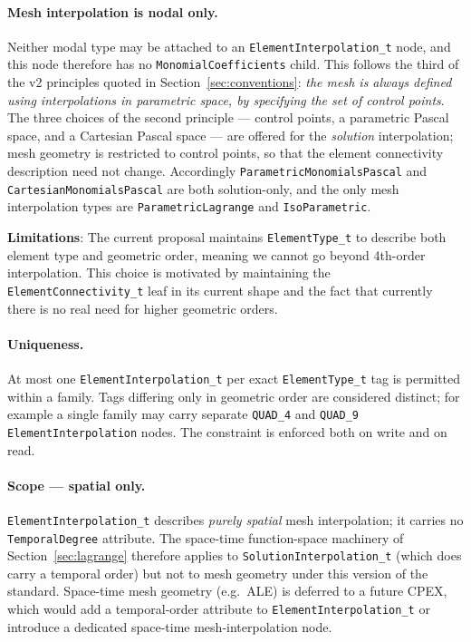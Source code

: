 \documentclass[11pt,letterpaper]{article}
\newenvironment{v2quote}
  {\begin{v2quoteframe}%
   \noindent{\footnotesize\sffamily\bfseries\color{cgnsblue}v2 text}%
   \nopagebreak\par\nopagebreak\vspace{0.15em}}
  {\end{v2quoteframe}}
\begin{document}
\paragraph{Mesh interpolation is nodal only.}
Neither modal type may be attached to an \texttt{ElementInterpolation\_t} node, and this node
therefore has no \texttt{MonomialCoefficients} child.  This follows the third of the v2
principles quoted in Section~\ref{sec:conventions}: \emph{the mesh is always defined using
interpolations in parametric space, by specifying the set of control points}.  The three
choices of the second principle --- control points, a parametric Pascal space, and a Cartesian
Pascal space --- are offered for the \emph{solution} interpolation; mesh geometry is restricted
to control points, so that the element connectivity description need not change.  Accordingly
\texttt{ParametricMonomialsPascal} and \texttt{CartesianMonomialsPascal} are both
solution-only, and the only mesh interpolation types are \texttt{ParametricLagrange} and
\texttt{IsoParametric}.

\begin{v2quote}
\textbf{Limitations}: The current proposal maintains \texttt{ElementType\_t} to describe both
element type and geometric order, meaning we cannot go beyond 4th-order interpolation.  This
choice is motivated by maintaining the \texttt{ElementConnectivity\_t} leaf in its current shape
and the fact that currently there is no real need for higher geometric orders.
\end{v2quote}

\paragraph{Uniqueness.}
At most one \texttt{ElementInterpolation\_t} per exact \texttt{ElementType\_t} tag is permitted
within a family.  Tags differing only in geometric order are considered distinct; for example a
single family may carry separate \texttt{QUAD\_4} and \texttt{QUAD\_9} \texttt{ElementInterpolation}
nodes.  The constraint is enforced both on write and on read.

\paragraph{Scope --- spatial only.}
\texttt{ElementInterpolation\_t} describes \emph{purely spatial} mesh interpolation;
it carries no \texttt{TemporalDegree} attribute.  The space-time function-space
machinery of Section~\ref{sec:lagrange} therefore applies to
\texttt{SolutionInterpolation\_t} (which does carry a temporal order) but not to
mesh geometry under this version of the standard.  Space-time mesh geometry (e.g.\
ALE) is deferred to a future CPEX, which would add a temporal-order attribute to
\texttt{ElementInterpolation\_t} or introduce a dedicated space-time mesh-interpolation node.
\end{document}
